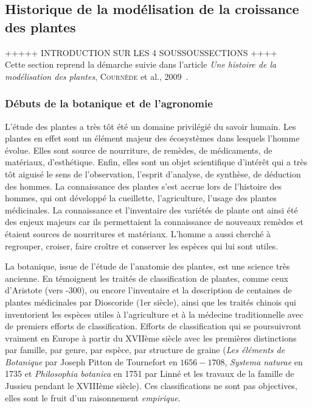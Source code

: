 \subsection{Historique de la modélisation de la croissance des plantes}
+++++ INTRODUCTION SUR LES 4 SOUSSOUSSECTIONS ++++ \\
Cette section reprend la démarche suivie dans 
l'article \emph{Une histoire de la modélisation des plantes}, \textsc{Cournède} et al., 2009~\cite{histoire_mod_plantes}.

\subsubsection{Débuts de la botanique et de l'agronomie}
L’étude des plantes a très tôt été un domaine privilégié du savoir humain.
Les plantes en effet sont un élément majeur des écosystèmes dans lesquels l’homme évolue. Elles sont source de nourriture, de remèdes, de médicaments,
de matériaux, d’esthétique. 
Enfin, elles sont un objet scientifique d’intérêt qui a très tôt aiguisé le sens de l’observation, l’esprit d’analyse, de synthèse, de déduction des hommes. 
La connaissance des plantes s’est accrue lors de l’histoire des hommes, qui ont développé la cueillette, l’agriculture, l’usage des plantes
médicinales. 
La connaissance et l’inventaire des variétés de plante ont ainsi été des
enjeux majeurs car ils permettaient la connaissance de nouveaux remèdes
et étaient sources de nourritures et matériaux. 
L’homme a aussi cherché à regrouper, croiser, faire croître 
et conserver les espèces qui lui sont utiles.

La botanique, issue de l’étude de l’anatomie des plantes,
est une science très ancienne.
En témoignent les traités de classification de plantes, comme ceux
d’Aristote (vers -300), ou encore l’inventaire et la description de
centaines de plantes médicinales par Dioscoride (1er siècle),
ainsi que les traités chinois qui inventorient les espèces utiles à
l’agriculture et à la médecine traditionnelle avec de premiers efforts
de classification. 
Efforts de classification qui se poursuivront vraiment en Europe à partir du
XVIIème siècle avec les premières distinctions par famille, par genre,
par espèce, par structure de graine (\emph{Les éléments de Botanique} par
Joseph Pitton de Tournefort en $1656-1708$, \emph{Systema naturae} en 1735
et \emph{Philosophia botanica} en 1751 par Linné et les travaux de la
famille de Jussieu pendant le XVIIIème siècle).
Ces classifications ne sont pas objectives, 
elles sont le fruit d’un raisonnement \emph{empirique}.


